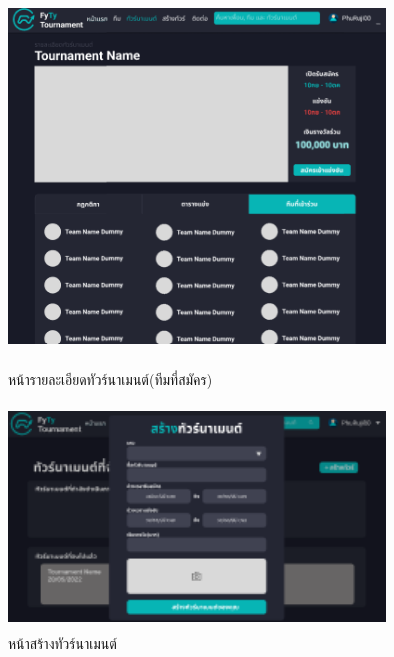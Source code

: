 \begin{figure}[h]
  \begin{center}
  \includegraphics[width=10cm,height=10cm,keepaspectratio]{TourTeam.png}
  \end{center}
  \caption[หน้ารายละเอียดทัวร์นาเมนต์(ทีมที่สมัคร)]{หน้ารายละเอียดทัวร์นาเมนต์(ทีมที่สมัคร)}
  \label{fig:หน้ารายละเอียดทัวร์นาเมนต์(ทีมที่สมัคร)}
\end{figure}

\begin{figure}[h]
  \begin{center}
  \includegraphics[width=10cm,height=6cm,keepaspectratio]{createtournament.png}
  \end{center}
  \caption[หน้าสร้างทัวร์นาเมนต์]{หน้าสร้างทัวร์นาเมนต์}
  \label{fig:หน้าสร้างทัวร์นาเมนต์}
\end{figure}


